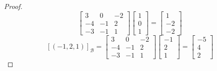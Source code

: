\documentclass[a4,10pt]{aleph-notas}
\begin{document}
\begin{proof}
$$\begin{bmatrix}
    3 & 0 & -2 \\ 
    -4 & -1 & 2 \\ 
    -3 & -1 & 1
\end{bmatrix}
\begin{bmatrix}
    1 \\ 
    0 \\ 
    1
\end{bmatrix}
=
\begin{bmatrix}
    1 \\ 
    -2 \\ 
    -2
\end{bmatrix}
$$
$$
[(-1,2,1)]_{\mathcal{B}} = \begin{bmatrix}
    3 & 0 & -2 \\ 
    -4 & -1 & 2 \\ 
    -3 & -1 & 1
\end{bmatrix}
\begin{bmatrix}
    -1 \\ 
    2 \\ 
    1
\end{bmatrix}
=
\begin{bmatrix}
    -5 \\ 
    4 \\ 
    2
\end{bmatrix}
$$
\end{proof}
\end{document}
